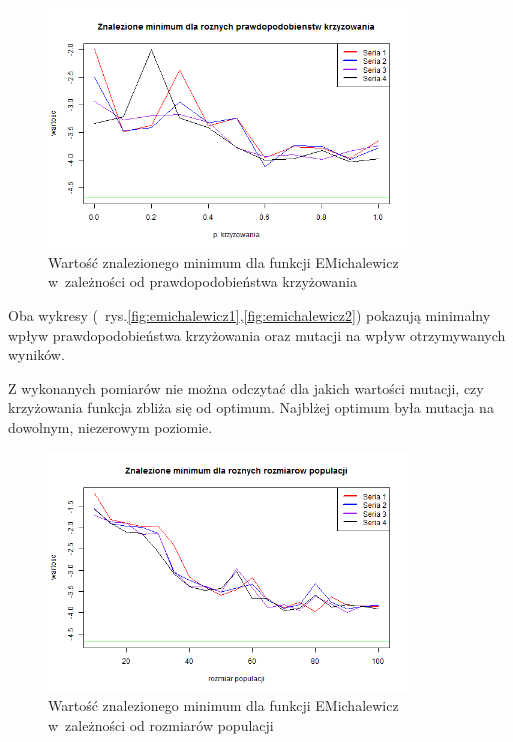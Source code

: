 \documentclass[11pt, a4paper]{article}
\newcommand{\fbi}{\leavevmode{\parindent=1em\indent}}
\begin{document}
\begin{figure}[H]
	\begin{center}
		\includegraphics[width=0.85\textwidth]{./assets/EMichalewicz3.png}
		\caption{Wartość znalezionego minimum dla funkcji EMichalewicz w~zależności od prawdopodobieństwa krzyżowania}
		\label{fig:emichalewicz3}
	\end{center}
\end{figure}

\fbi
Oba wykresy (~rys.\ref{fig:emichalewicz1},\ref{fig:emichalewicz2}) pokazują minimalny wpływ prawdopodobieństwa krzyżowania oraz mutacji na wpływ otrzymywanych wyników. 

\fbi
Z wykonanych pomiarów nie można odczytać dla jakich wartości mutacji, czy krzyżowania funkcja zbliża się od optimum. Najblżej optimum była mutacja na dowolnym, niezerowym poziomie.

\begin{figure}[H]
	\begin{center}
		\includegraphics[width=0.85\textwidth]{./assets/EMichalewicz4.png}
		\caption{Wartość znalezionego minimum dla funkcji EMichalewicz w~zależności od rozmiarów populacji}
		\label{fig:emichalewicz4}
	\end{center}
\end{figure}
\end{document}
